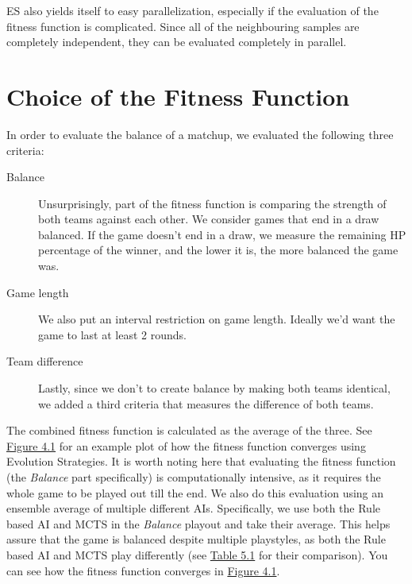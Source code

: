 ES also yields itself to easy parallelization, especially if the evaluation of the fitness
function is complicated. Since all of the neighbouring samples are completely independent,
they can be evaluated completely in parallel.

\section{Choice of the Fitness Function}

In order to evaluate the balance of a matchup, we evaluated the following three
criteria:

\begin{description}
\item [Balance] Unsurprisingly, part of the fitness function is comparing the
  strength of both teams against each other.  We consider games that end in a
    draw balanced.  If the game doesn't end in a draw, we measure the remaining
    HP percentage of the winner, and the lower it is, the more balanced the
    game was.
\item [Game length] We also put an interval restriction on game length. Ideally
  we'd want the game to last at least 2 rounds.
\item [Team difference] Lastly, since we don't to create balance by making both
  teams identical, we added a third criteria that measures the difference of
    both teams.
\end{description}

The combined fitness function is calculated as the average of the three.
See \hyperref[fig:converging-es]{Figure 4.1} for an example
plot of how the fitness function converges using Evolution Strategies.
It is worth noting here that evaluating the fitness function (the \emph{Balance}
part specifically) is computationally intensive, as it requires the whole game
to be played out till the end. We also do this evaluation using an ensemble average of multiple different AIs.
Specifically, we use both the Rule based AI and MCTS in the \emph{Balance} playout and take their average.
This helps assure that the game is balanced despite multiple playstyles, as both the Rule based AI and MCTS
play differently (see \hyperref[tab:winrates]{Table 5.1} for their comparison). You can see how the fitness function
converges in \hyperref[fig:converging-es]{Figure 4.1}.

